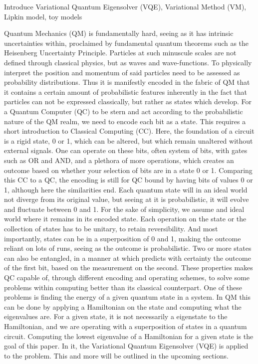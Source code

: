Introduce Variational Quantum Eigensolver (VQE), Variational Method (VM), Lipkin model, toy models

Quantum Mechanics (QM) is fundamentally hard, seeing as it has intrinsic uncertainties within, proclaimed by fundamental quantum theorems such as the Heisenberg Uncertainty Principle. Particles at such minuscule scales are not defined through classical physics, but as waves and wave-functions. To physically interpret the position and momentum of said particles need to be assessed as probability distributions. Thus it is manifestly encoded in the fabric of QM that it contains a certain amount of probabilistic features inherently in the fact that particles can not be expressed classically, but rather as states which develop. 
\newline\newline
For a Quantum Computer (QC) to be stern and act according to the probabilistic nature of the QM realm, we need to encode each bit as a state. This requires a short introduction to Classical Computing (CC). Here, the foundation of a circuit is a rigid state, 0 or 1, which can be altered, but which remain unaltered without external signals. One can operate on these bits, often system of bits, with gates such as OR and AND, and a plethora of more operations, which creates an outcome based on whether your selection of bits are in a state 0 or 1. 
\newline\newline
Comparing this CC to a QC, the encoding is still for QC bound by having bits of values 0 or 1, although here the similarities end. Each quantum state will in an ideal world not diverge from its original value, but seeing at it is probabilistic, it will evolve and fluctuate between 0 and 1. For the sake of simplicity, we assume and ideal world where it remains in its encoded state. Each operation on the state or the collection of states has to be unitary, to retain reversibility. And most importantly, states can be in a superposition of 0 and 1, making the outcome reliant on lots of runs, seeing as the outcome is probabilistic. Two or more states can also be entangled, in a manner at which predicts with certainty the outcome of the first bit, based on the measurement on the second. These properties makes QC capable of, through different encoding and operating schemes, to solve some problems within computing better than its classical counterpart. 
\newline\newline
One of these problems is finding the energy of a given quantum state in a system. In QM this can be done by applying a Hamiltonian on the state and computing what the eigenvalues are. For a given state, it is not necessarily a eigenstate to the Hamiltonian, and we are operating with a superposition of states in a quantum circuit. Computing the lowest eigenvalue of a Hamiltonian for a given state is the goal of this paper. In it, the Variational Quantum Eigensolver (VQE) is applied to the problem. This and more will be outlined in the upcoming sections.
